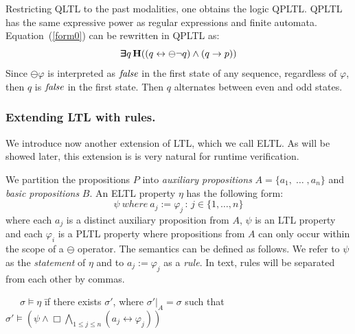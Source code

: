 Restricting QLTL to the past modalities, one obtains the logic QPLTL. QPLTL has the same expressive
power as regular expressions and finite automata.
Equation~(\ref{form0}) can
be rewritten in QPLTL as:
\begin{equation} \label{form1} \bm{\exists}\kern-0.6em\bm{\exists} q \,
{\bf H} (( q \leftrightarrow \ominus \neg q )   \wedge (q \rightarrow p ) )\end{equation}
Since $\ominus \varphi $ is interpreted as  $\mathit{false}$ in the first state of any sequence, regardless of $\varphi$, then
$q$ is $\mathit{false}$ in the first state. Then $q$ alternates between even and odd states.




\subsubsection{Extending LTL with rules.}

We introduce now another extension of LTL, which we call ELTL.
As will be showed later, this extension is
is very natural for runtime verification.

We partition the propositions $P$ into
{\em auxiliary propositions} $A = \{ a_1 , \; \ldots\; , a_n \}$
and {\em basic propositions} $B$.
An ELTL property $\eta$ has the following form: 
\begin{equation} \label{ELTL}
\psi \mathit{\ where\ } a_j  := \varphi_j \, : \, 
 {j \in \{1, \ldots , n\}} \end{equation}
where each $a_j$ is a distinct auxiliary proposition from $A$,
$\psi$ is an LTL property and each $\varphi_i$ 
is a PLTL property where propositions from $A$ can
only occur within the scope of a $\ominus$ operator.
The semantics can be defined as follows. We refer to $\psi$
as the {\em statement} of $\eta$ and to 
$a_j  := \varphi_j$ as a {\em rule}. In text, rules
 will be separated from each other by commas. 
\begin{tabbing}
\ \ \ $\sigma \models \eta$ \=  if there exists $\sigma'$, where
$\sigma' |_A = \sigma$ such that \\
 \> $\sigma' \models ( \psi  \wedge   \Box \bigwedge_{1 \leq j \leq n} ( a_j \leftrightarrow \varphi_j)) $
\end{tabbing}

